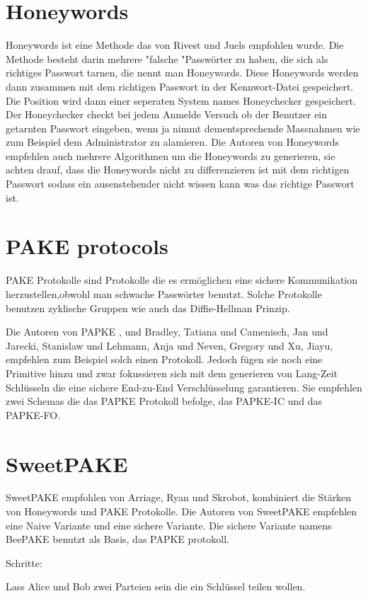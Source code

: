 \documentclass[conference, compsoc]{IEEEtran}
\begin{document}
\section{Honeywords}
Honeywords ist eine Methode das von Rivest und Juels empfohlen
wurde\cite{juels2013honeywords}. Die Methode besteht darin mehrere "falsche
"Passwörter zu haben, die sich als richtiges Passwort tarnen, die nennt man
Honeywords. Diese Honeywords werden dann zusammen mit dem richtigen Passwort in
der Kennwort-Datei gespeichert. Die Position wird dann einer seperaten System
names Honeychecker gespeichert. Der Honeychecker checkt bei jedem Anmelde
Versuch ob der Benutzer ein getarnten Passwort eingeben, wenn ja nimmt
dementsprechende Massnahmen wie zum Beispiel dem Administrator zu alamieren. 
Die Autoren von Honeywords empfehlen auch mehrere Algorithmen um die Honeywords
zu generieren, sie achten drauf, dass die Honeywords nicht zu differenzieren ist
mit dem richtigen Passwort sodass ein ausenstehender nicht wissen kann was das
richtige Passwort ist.

\section{PAKE protocols}
PAKE Protokolle sind Protokolle die es ermöglichen eine sichere Kommunikation
herzustellen,obwohl man schwache Passwörter benutzt. Solche Protokolle benutzen
zyklische Gruppen wie auch das Diffie-Hellman Prinzip.

Die Autoren von PAPKE \cite{bradley2019passwords}, und Bradley, Tatiana und
Camenisch, Jan und Jarecki, Stanislaw und Lehmann, Anja und Neven, Gregory und
Xu, Jiayu, empfehlen zum Beispiel solch einen Protokoll. Jedoch fügen sie noch
eine Primitive hinzu und zwar fokussieren sich mit dem generieren von Lang-Zeit
Schlüsseln die eine sichere End-zu-End Verschlüsselung garantieren. Sie
empfehlen zwei Schemas die das PAPKE Protokoll befolge, das PAPKE-IC und das
PAPKE-FO.

\section{SweetPAKE}
SweetPAKE empfohlen von Arriage, Ryan und Skrobot, kombiniert die Stärken
von Honeywords und PAKE Protokolle. Die Autoren von SweetPAKE empfehlen
eine Naive Variante und eine sichere Variante. Die sichere Variante namens 
BeePAKE benutzt als Basis, das PAPKE protokoll.

Schritte:

Lass Alice und Bob zwei Parteien sein die ein Schlüssel teilen wollen.
\end{document}
